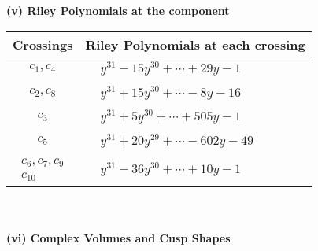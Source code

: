 \documentclass[1p]{elsarticle_modified}
\theoremstyle{definition}
\begin{document}
\flushleft \textbf{(v) Riley Polynomials at the component}\newline \\
\begin{tabular}{m{50pt}|m{274pt}}
Crossings & \hspace{64pt}Riley Polynomials at each crossing \\
\hline $$\begin{aligned}c_{1},c_{4}\end{aligned}$$&$\begin{aligned}
&y^{31}-15 y^{30}+\cdots+29 y-1
\end{aligned}$\\
\hline $$\begin{aligned}c_{2},c_{8}\end{aligned}$$&$\begin{aligned}
&y^{31}+15 y^{30}+\cdots-8 y-16
\end{aligned}$\\
\hline $$\begin{aligned}c_{3}\end{aligned}$$&$\begin{aligned}
&y^{31}+5 y^{30}+\cdots+505 y-1
\end{aligned}$\\
\hline $$\begin{aligned}c_{5}\end{aligned}$$&$\begin{aligned}
&y^{31}+20 y^{29}+\cdots-602 y-49
\end{aligned}$\\
\hline $$\begin{aligned}c_{6},c_{7},c_{9}\\c_{10}\end{aligned}$$&$\begin{aligned}
&y^{31}-36 y^{30}+\cdots+10 y-1
\end{aligned}$\\
\hline
\end{tabular}\\~\\
\newpage\flushleft \textbf{(vi) Complex Volumes and Cusp Shapes}
\end{document}
